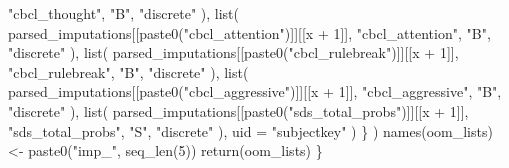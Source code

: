 \documentclass[
  letterpaper,
  DIV=11,
  numbers=noendperiod]{scrreprt}
\newenvironment{Shaded}{\begin{snugshade}}{\end{snugshade}}
\newcommand{\AttributeTok}[1]{\textcolor[rgb]{0.40,0.45,0.13}{#1}}
\newcommand{\DecValTok}[1]{\textcolor[rgb]{0.68,0.00,0.00}{#1}}
\newcommand{\FunctionTok}[1]{\textcolor[rgb]{0.28,0.35,0.67}{#1}}
\newcommand{\NormalTok}[1]{\textcolor[rgb]{0.00,0.23,0.31}{#1}}
\newcommand{\OtherTok}[1]{\textcolor[rgb]{0.00,0.23,0.31}{#1}}
\newcommand{\SpecialCharTok}[1]{\textcolor[rgb]{0.37,0.37,0.37}{#1}}
\newcommand{\StringTok}[1]{\textcolor[rgb]{0.13,0.47,0.30}{#1}}
\begin{document}
\begin{Shaded}
\begin{Highlighting}[]
                    \StringTok{"cbcl\_thought"}\NormalTok{,}
                    \StringTok{"B"}\NormalTok{,}
                    \StringTok{"discrete"}
\NormalTok{                ),}
                \FunctionTok{list}\NormalTok{(}
\NormalTok{                    parsed\_imputations[[}\FunctionTok{paste0}\NormalTok{(}\StringTok{"cbcl\_attention"}\NormalTok{)]][[x }\SpecialCharTok{+} \DecValTok{1}\NormalTok{]],}
                    \StringTok{"cbcl\_attention"}\NormalTok{,}
                    \StringTok{"B"}\NormalTok{,}
                    \StringTok{"discrete"}
\NormalTok{                ),}
                \FunctionTok{list}\NormalTok{(}
\NormalTok{                    parsed\_imputations[[}\FunctionTok{paste0}\NormalTok{(}\StringTok{"cbcl\_rulebreak"}\NormalTok{)]][[x }\SpecialCharTok{+} \DecValTok{1}\NormalTok{]],}
                    \StringTok{"cbcl\_rulebreak"}\NormalTok{,}
                    \StringTok{"B"}\NormalTok{,}
                    \StringTok{"discrete"}
\NormalTok{                ),}
                \FunctionTok{list}\NormalTok{(}
\NormalTok{                    parsed\_imputations[[}\FunctionTok{paste0}\NormalTok{(}\StringTok{"cbcl\_aggressive"}\NormalTok{)]][[x }\SpecialCharTok{+} \DecValTok{1}\NormalTok{]],}
                    \StringTok{"cbcl\_aggressive"}\NormalTok{,}
                    \StringTok{"B"}\NormalTok{,}
                    \StringTok{"discrete"}
\NormalTok{                ),}
                \FunctionTok{list}\NormalTok{(}
\NormalTok{                    parsed\_imputations[[}\FunctionTok{paste0}\NormalTok{(}\StringTok{"sds\_total\_probs"}\NormalTok{)]][[x }\SpecialCharTok{+} \DecValTok{1}\NormalTok{]],}
                    \StringTok{"sds\_total\_probs"}\NormalTok{,}
                    \StringTok{"S"}\NormalTok{,}
                    \StringTok{"discrete"}
\NormalTok{                ),}
                \AttributeTok{uid =} \StringTok{"subjectkey"}
\NormalTok{            )}
\NormalTok{        \}}
\NormalTok{    )}
    \FunctionTok{names}\NormalTok{(oom\_lists) }\OtherTok{\textless{}{-}} \FunctionTok{paste0}\NormalTok{(}\StringTok{"imp\_"}\NormalTok{, }\FunctionTok{seq\_len}\NormalTok{(}\DecValTok{5}\NormalTok{))}
    \FunctionTok{return}\NormalTok{(oom\_lists)}
\NormalTok{\}}


\end{Highlighting}
\end{Shaded}
\end{document}
